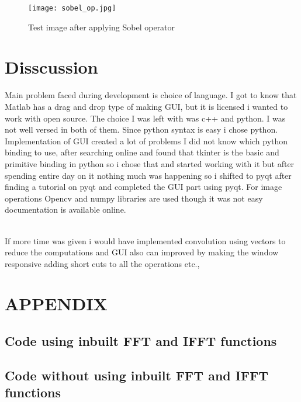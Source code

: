 \documentclass{article}
\begin{document}
\begin{figure}[htb]

\begin{minipage}[b]{1.0\linewidth}
  \centering
  \centerline{\texttt{[image: sobel\_op.jpg]}}
  \centerline{Test image after applying Sobel operator}\medskip
\end{minipage}
%
\end{figure}






\section{Disscussion}
\label{sec:ref}

Main problem faced during development is choice of language. I got to know that Matlab has a drag and drop type of making GUI, but it is licensed i wanted to work with open source. The choice I was left with was c++ and python. I was not well versed in both of them. Since python syntax is easy i chose python. Implementation of  GUI created a lot of problems I did not know which python binding to use, after searching online and found that tkinter is the basic and primitive binding in python so i chose that and started working with it but after spending entire day on it nothing much was happening so i shifted to pyqt after finding a tutorial\cite{WEBSITE:9} on pyqt and completed the GUI part using pyqt. For image operations Opencv \cite{WEBSITE:3}and numpy\cite{WEBSITE:1} libraries are used though it was not easy documentation is available online.

\\ If more time was given i would have implemented convolution using vectors to reduce the computations and GUI also can improved by  making the window responsive adding short cuts to all the operations etc.,



\onecolumn
\section{APPENDIX}
\subsection{Code using inbuilt FFT and IFFT functions }

\subsection{Code  without using inbuilt FFT and IFFT functions }

\end{document}
